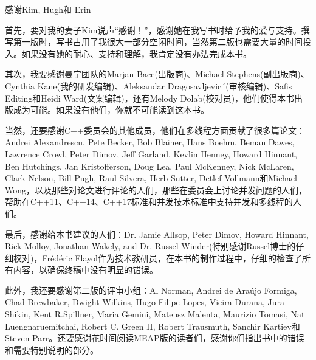 \centerline{感谢Kim, Hugh和 Erin}

首先，要对我的妻子Kim说声“感谢！”，感谢她在我写书时给予我的爱与支持。撰写第一版时，写书占用了我很大一部分空闲时间，当然第二版也需要大量的时间投入。如果没有她的耐心、支持和理解，我肯定没有办法完成本书。

其次，我要感谢曼宁团队的Marjan Bace(出版商)、Michael Stephens(副出版商)、Cynthia Kane(我的研发编辑)、Aleksandar Dragosavljevic´(审核编辑)、Safis Editing和Heidi Ward(文案编辑)，还有Melody Dolab(校对员)，他们使得本书出版成为可能。如果没有他们，你就不可能读到这本书。

当然，还要感谢C++委员会的其他成员，他们在多线程方面贡献了很多篇论文：Andrei Alexandrescu, Pete Becker, Bob Blainer, Hans Boehm, Beman Dawes, Lawrence Crowl, Peter Dimov, Jeff Garland, Kevlin Henney, Howard Hinnant, Ben Hutchings, Jan Kristofferson, Doug Lea, Paul McKenney, Nick McLaren, Clark Nelson, Bill Pugh, Raul Silvera, Herb Sutter, Detlef Vollmann和Michael Wong，以及那些对论文进行评论的人们，那些在委员会上讨论并发问题的人们，帮助在C++11、C++14、C++17标准和并发技术标准中支持并发和多线程的人们。

最后，感谢给本书建议的人们：Dr. Jamie Allsop, Peter Dimov, Howard Hinnant, Rick Molloy, Jonathan Wakely, and Dr. Russel Winder(特别感谢Russel博士的仔细校对)，Frédéric Flayol作为技术教研员，在本书的制作过程中，仔细的检查了所有内容，以确保终稿中没有明显的错误。

此外，我还要感谢第二版的评审小组：Al Norman, Andrei de Araújo Formiga, Chad Brewbaker, Dwight Wilkins, Hugo Filipe Lopes, Vieira Durana, Jura Shikin, Kent R.Spillner, Maria Gemini, Mateusz Malenta, Maurizio Tomasi, Nat Luengnaruemitchai, Robert C. Green II, Robert Trausmuth, Sanchir Kartiev和 Steven Parr。还要感谢花时间阅读MEAP版的读者们，感谢你们指出书中的错误和需要特别说明的部分。